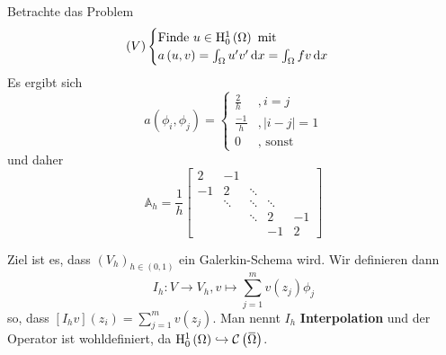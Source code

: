 \begin{expl}
	Betrachte das Problem
	\begin{equation*}
		\left(V\right) \begin{cases}
			\text{Finde }u\in \mathrm{H}^{1}_{0}\left(\Omega\right)\text{ mit}\\
			a\left(u,v\right) = \int_{\Omega}u^{\prime}v^{\prime}\,\mathrm{d} x = \int_{\Omega}fv\,\mathrm{d} x
		\end{cases}
	\end{equation*}
	Es ergibt sich
	\begin{equation*}
		a\left(\phi_{i},\phi_{j}\right) = \begin{cases}
			\frac{2}{h} &, i=j\\
			\frac{-1}{h} &, |i-j|=1\\
			0 &,\text{ sonst}
		\end{cases}
	\end{equation*}
	und daher
	\begin{equation*}
		\mathbb{A}_{h} = \frac{1}{h}\begin{bmatrix}
		2  & -1     &        &        &    \\
		-1 & 2      & \ddots &        &    \\
		   & \ddots & \ddots & \ddots &    \\
		   &        & \ddots & 2      & -1 \\
		   &        &        & -1     & 2
		\end{bmatrix}
	\end{equation*}
\end{expl}
Ziel ist es, dass $\left(V_{h}\right)_{h\in\left(0,1\right)}$ ein Galerkin-Schema wird. Wir definieren dann
\begin{equation*}
	I_{h}\colon V\to V_{h}, v\mapsto \sum_{j=1}^{m} v\left(z_{j}\right)\phi_{j}
\end{equation*}
so, dass $\left[I_{h}v\right]\left(z_{i}\right) = \sum_{j=1}^{m}v\left(z_{j}\right)$. Man nennt $I_{h}$ \textbf{Interpolation} und der Operator ist wohldefiniert, da $\H^{1}_{0}\left(\W\right)\hookrightarrow \C\left(\overbar{\W}\right)$.{}


